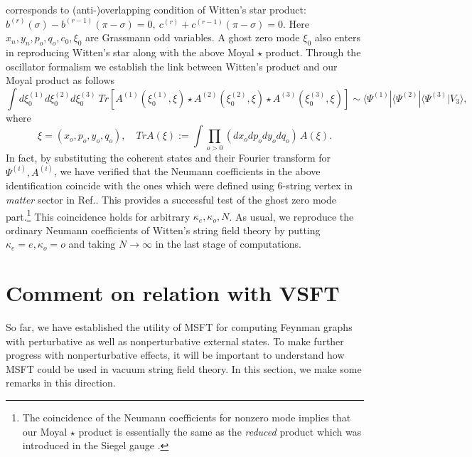 \documentclass[a4paper,11pt]{article}
\begin{document}
corresponds to (anti-)overlapping condition of Witten's star product: $%
b^{(r)}(\sigma )-b^{(r-1)}(\pi -\sigma )=0,\ c^{(r)}+c^{(r-1)}(\pi -\sigma
)=0$. Here $x_{n},y_{n},p_{o},q_{o},c_{0},\xi _{0}$ are Grassmann odd
variables. A ghost zero mode $\xi _{0}$ also enters in reproducing Witten's
star along with the above Moyal $\star $ product. Through the oscillator
formalism \cite{GJ2} we establish the link between Witten's product and our
Moyal product as follows
\begin{equation}
\int d\xi _{0}^{(1)}d\xi _{0}^{(2)}d\xi _{0}^{(3)}~Tr\left[ A^{(1)}(\xi
_{0}^{(1)},\xi )\star A^{(2)}(\xi _{0}^{(2)},\xi )\star A^{(3)}(\xi
_{0}^{(3)},\xi )\right] \sim \langle \Psi ^{(1)}|\langle \Psi ^{(2)}|\langle
\Psi ^{(3)}|V_{3}\rangle ,
\end{equation}%
where
\begin{equation}
\xi =(x_{o},p_{o},y_{o},q_{o}),\quad TrA(\xi ):=\int
\prod_{o>0}(dx_{o}dp_{o}dy_{o}dq_{o})\,A(\xi ).
\end{equation}%
In fact, by substituting the coherent states and their Fourier transform for
$\Psi ^{(i)},A^{(i)}$, we have verified that the Neumann coefficients in the
above identification coincide with the ones which were defined using
6-string vertex in \textit{matter} sector in Ref.\cite{BM2}. This provides a
successful test of the ghost zero mode part.\footnote{%
The coincidence of the Neumann coefficients for nonzero mode implies that
our Moyal $\star $ product is essentially the same as the \textit{reduced}
product which was introduced in the Siegel gauge \cite{IK,Oku}.} This
coincidence holds for arbitrary $\kappa _{e},\kappa _{o},N$. As usual, we
reproduce the ordinary Neumann coefficients of Witten's string field theory
by putting $\kappa _{e}=e,\kappa _{o}=o$ and taking $N\rightarrow \infty $
in the last stage of computations.

\section{Comment on relation with VSFT}

So far, we have established the utility of MSFT for computing Feynman graphs
with perturbative as well as nonperturbative external states. To make
further progress with nonperturbative effects, it will be important to
understand how MSFT could be used in vacuum string field theory. In this
section, we make some remarks in this direction.
\end{document}
